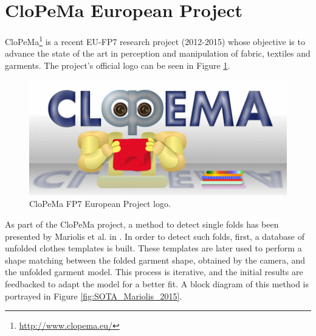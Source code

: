 \section{CloPeMa European Project}
\label{sota:clopema}

CloPeMa\footnote{\url{http://www.clopema.eu/}} is a recent EU-FP7 research project (2012-2015) whose objective is to advance the state of the art in perception and manipulation of fabric, textiles and garments. The project's official logo can be seen in Figure \ref{fig:SOTA_CloPeMa_logo}.

\begin{figure}[thpb]
    \centering
    \includegraphics[width=0.85
    \textwidth]{figures/SOTA_CloPeMa_logo.png}
    \caption{CloPeMa FP7 European Project logo.}
    \label{fig:SOTA_CloPeMa_logo}
\end{figure}

 As part of the CloPeMa project, a method to detect single folds has been presented by Mariolis et al. in \cite{Mariolis2013, Mariolis2015}. In order to detect such folds, first, a database of unfolded clothes templates is built. These templates are later used to perform a shape matching between the folded garment shape, obtained by the camera, and the unfolded garment model. This process is iterative, and the initial results are feedbacked to adapt the model for a better fit. A block diagram of this method is portrayed in Figure \ref{fig:SOTA_Mariolis_2015}.
 
\pagebreak

